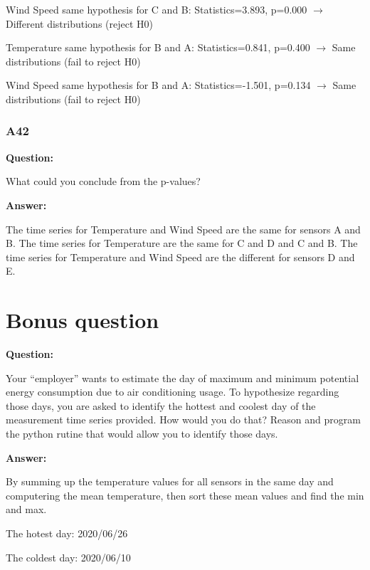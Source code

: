 \documentclass[a4paper]{article}
\numberwithin{figure}{section}
\numberwithin{table}{section}
\begin{document}
Wind Speed same hypothesis for C and B: Statistics=3.893, p=0.000 $\rightarrow$ Different distributions (reject H0)


Temperature same hypothesis for B and A: Statistics=0.841, p=0.400 $\rightarrow$ Same distributions (fail to reject H0)

Wind Speed same hypothesis for B and A: Statistics=-1.501, p=0.134 $\rightarrow$ Same distributions (fail to reject H0)

\section{A42}

\textbf{Question:}

What could you conclude from the p-values?

\textbf{Answer:}

The time series for Temperature and Wind Speed are the same for sensors A and B. The time series for Temperature are the same for C and D and C and B. The time series for Temperature and Wind Speed are the different for sensors D and E.

\part{Bonus question}

\textbf{Question:}

Your “employer” wants to estimate the day of maximum and minimum potential energy consumption due to air conditioning usage. To hypothesize regarding those days, you are asked to identify the hottest and coolest day of the measurement time series provided. How would you do that? Reason and program the python rutine that would allow you to identify those days.

\textbf{Answer:}

By summing up the temperature values for all sensors in the same day and computering the mean temperature, then sort these mean values and find the min and max.

The hotest day: 2020/06/26

The coldest day: 2020/06/10



\end{document}
